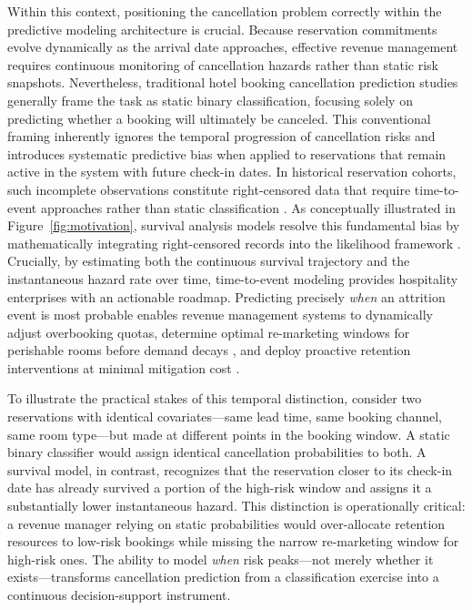 \documentclass[pdflatex,sn-mathphys-ay]{sn-jnl}
\theoremstyle{thmstyleone}%
\theoremstyle{thmstyletwo}%
\theoremstyle{thmstylethree}%
\begin{document}
Within this context, positioning the cancellation problem correctly within the predictive modeling architecture is crucial. Because reservation commitments evolve dynamically as the arrival date approaches, effective revenue management requires continuous monitoring of cancellation hazards rather than static risk snapshots. Nevertheless, traditional hotel booking cancellation prediction studies generally frame the task as static binary classification, focusing solely on predicting whether a booking will ultimately be canceled. This conventional framing inherently ignores the temporal progression of cancellation risks and introduces systematic predictive bias when applied to reservations that remain active in the system with future check-in dates. In historical reservation cohorts, such incomplete observations constitute right-censored data that require time-to-event approaches rather than static classification \citep{kleinbaum2012survival, langbein2025interpretable}. As conceptually illustrated in Figure~\ref{fig:motivation}, survival analysis models resolve this fundamental bias by mathematically integrating right-censored records into the likelihood framework \citep{kovalev2020survlime, langbein2025interpretable}. Crucially, by estimating both the continuous survival trajectory and the instantaneous hazard rate over time, time-to-event modeling provides hospitality enterprises with an actionable roadmap. Predicting precisely \textit{when} an attrition event is most probable enables revenue management systems to dynamically adjust overbooking quotas, determine optimal re-marketing windows for perishable rooms before demand decays \citep{mir2026decoding}, and deploy proactive retention interventions at minimal mitigation cost \citep{antonio2017predicting, ampountolas2025predicting}.

To illustrate the practical stakes of this temporal distinction, consider two reservations with identical covariates—same lead time, same booking channel, same room type—but made at different points in the booking window. A static binary classifier would assign identical cancellation probabilities to both. A survival model, in contrast, recognizes that the reservation closer to its check-in date has already survived a portion of the high-risk window and assigns it a substantially lower instantaneous hazard. This distinction is operationally critical: a revenue manager relying on static probabilities would over-allocate retention resources to low-risk bookings while missing the narrow re-marketing window for high-risk ones. The ability to model \textit{when} risk peaks—not merely whether it exists—transforms cancellation prediction from a classification exercise into a continuous decision-support instrument.
\end{document}
